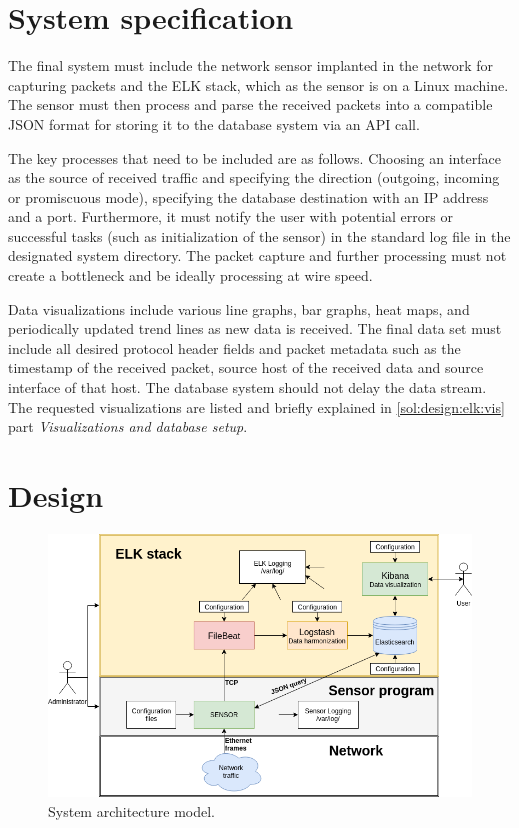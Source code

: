 \documentclass[12pt,a4paper,twoside]{book}
\begin{document}
    \section{System specification} \label{solution:spec}
        The final system must include the network sensor implanted in the network for capturing packets and the ELK stack, which as the sensor is on a Linux machine. The sensor must then process and parse the received packets into a compatible JSON format for storing it to the database system via an API call.\par
        The key processes that need to be included are as follows. Choosing an interface as the source of received traffic and specifying the direction (outgoing, incoming or promiscuous mode), specifying the database destination with an IP address and a port. Furthermore, it must notify the user with potential errors or successful tasks (such as initialization of the sensor) in the standard log file in the designated system directory. The packet capture and further processing must not create a bottleneck and be ideally processing at wire speed.\par
        Data visualizations include various line graphs, bar graphs, heat maps, and periodically updated trend lines as new data is received. The final data set must include all desired protocol header fields and packet metadata such as the timestamp of the received packet, source host of the received data and source interface of that host. The database system should not delay the data stream. The requested visualizations are listed and briefly explained in \autoref{sol:design:elk:vis} part \emph{Visualizations and database setup}.
    \section{Design} \label{solution:design}
        \begin{figure}
            \centering
            \includegraphics[scale=0.5]{architecture}
            \caption{System architecture model.}
            \label{figure:sol:architecture}
        \end{figure}
\end{document}
